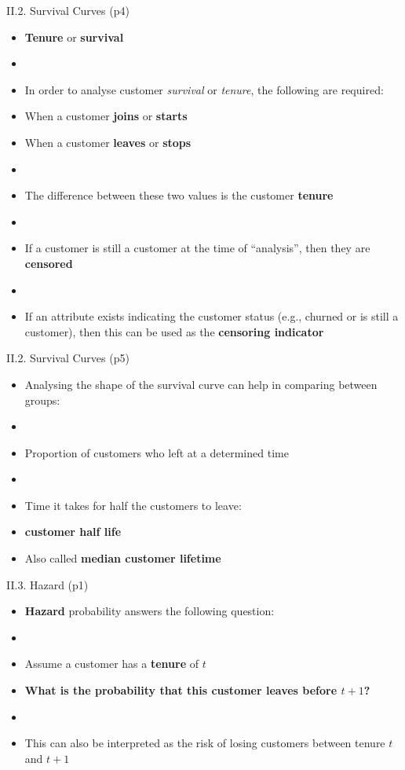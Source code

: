 \documentclass[handout]{beamer}
\newcommand{\strong}[1]{\textbf{\color{teal} #1}}
\newcommand{\stronger}[1]{\textbf{\color{purple} #1}}
\begin{document}
\begin{frame}{II.2. Survival Curves (p4)}
\begin{itemize}
\item[] \stronger{Tenure} or \stronger{survival}
\item[]
\item In order to analyse customer \emph{survival} or \emph{tenure}, the following are required:
\item When a customer \strong{joins} or \strong{starts}
\item When a customer \strong{leaves} or \strong{stops}
\item[]
\item The difference between these two values is the customer \stronger{tenure}
\item[]
\item If a customer is still a customer at the time of ``analysis'', then they are \stronger{censored}
\item[]
\item If an attribute exists indicating the customer status (e.g., churned or is still a customer), then this can be used as the \strong{censoring indicator}
\end{itemize}  	
\end{frame}
\begin{frame}{II.2. Survival Curves (p5)}
\begin{itemize}
\item[] Analysing the shape of the survival curve can help in comparing between groups:
\item[]
\item Proportion of customers who left at a determined time
\item[]
\item Time it takes for half the customers to leave:
\item[] \stronger{customer half life}
\item[] Also called \stronger{median customer lifetime}
\end{itemize}
\end{frame}
\begin{frame}{II.3. Hazard (p1)}
\begin{itemize}
\item[] \stronger{Hazard} probability answers the following question:
\item[]
\item Assume a customer has a \strong{tenure} of $t$
\item \textbf{What is the probability that this customer leaves before $t+1$?}
\item[]
\item This can also be interpreted as the risk of losing customers between tenure $t$ and $t+1$
\end{itemize}
\end{frame}
\end{document}
